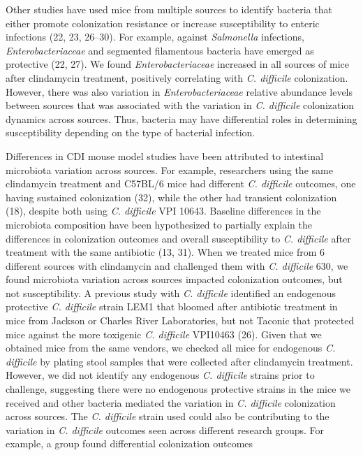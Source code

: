 \documentclass[
  11pt,
]{article}
\begin{document}
Other studies have used mice from multiple sources to identify bacteria
that either promote colonization resistance or increase susceptibility
to enteric infections (22, 23, 26--30). For example, against
\emph{Salmonella} infections, \emph{Enterobacteriaceae} and segmented
filamentous bacteria have emerged as protective (22, 27). We found
\emph{Enterobacteriaceae} increased in all sources of mice after
clindamycin treatment, positively correlating with \emph{C. difficile}
colonization. However, there was also variation in
\emph{Enterobacteriaceae} relative abundance levels between sources that
was associated with the variation in \emph{C. difficile} colonization
dynamics across sources. Thus, bacteria may have differential roles in
determining susceptibility depending on the type of bacterial infection.

Differences in CDI mouse model studies have been attributed to
intestinal microbiota variation across sources. For example, researchers
using the same clindamycin treatment and C57BL/6 mice had different
\emph{C. difficile} outcomes, one having sustained colonization (32),
while the other had transient colonization (18), despite both using
\emph{C. difficile} VPI 10643. Baseline differences in the microbiota
composition have been hypothesized to partially explain the differences
in colonization outcomes and overall susceptibility to \emph{C.
difficile} after treatment with the same antibiotic (13, 31). When we
treated mice from 6 different sources with clindamycin and challenged
them with \emph{C. difficile} 630, we found microbiota variation across
sources impacted colonization outcomes, but not susceptibility. A
previous study with \emph{C. difficile} identified an endogenous
protective \emph{C. difficile} strain LEM1 that bloomed after antibiotic
treatment in mice from Jackson or Charles River Laboratories, but not
Taconic that protected mice against the more toxigenic \emph{C.
difficile} VPI10463 (26). Given that we obtained mice from the same
vendors, we checked all mice for endogenous \emph{C. difficile} by
plating stool samples that were collected after clindamycin treatment.
However, we did not identify any endogenous \emph{C. difficile} strains
prior to challenge, suggesting there were no endogenous protective
strains in the mice we received and other bacteria mediated the
variation in \emph{C. difficile} colonization across sources. The
\emph{C. difficile} strain used could also be contributing to the
variation in \emph{C. difficile} outcomes seen across different research
groups. For example, a group found differential colonization outcomes
\end{document}
